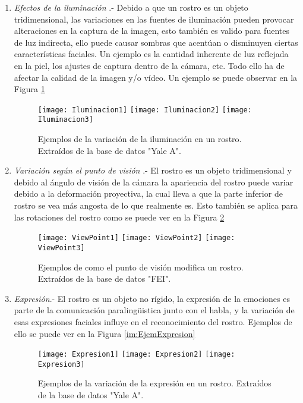 \begin{enumerate}[1.]
\item \textit{Efectos de la iluminación} \cite{kalocsai1998face} \cite{johnston1992recognising} \cite{bruce1998human} \cite{hill1996effects}.- Debido a que un rostro es un objeto tridimensional, las variaciones en las fuentes de iluminación pueden provocar alteraciones en la captura de la imagen, esto también es valido para fuentes de luz indirecta, ello puede causar sombras que acentúan o disminuyen ciertas características faciales. Un ejemplo es la cantidad inherente de luz reflejada en la piel, los ajustes de captura dentro de la cámara, etc. Todo ello ha de afectar la calidad de la imagen y/o vídeo. Un ejemplo se puede observar en la Figura \ref{im:EjemIluminacion}
\begin{figure}[h]
\center
\texttt{[image: Iluminacion1]}
\texttt{[image: Iluminacion2]}
\texttt{[image: Iluminacion3]}
\caption{Ejemplos de la variación de la iluminación en un rostro. Extraídos de la base de datos "Yale A".}
\label{im:EjemIluminacion}
\end{figure}
\item \textit{Variación según el punto de visión}  \cite{hill1997information}.- El rostro es un objeto tridimensional y debido al ángulo de visión de la cámara la apariencia del rostro puede variar debido a la deformación proyectiva, la cual lleva a que la parte inferior de rostro se vea más angosta de lo que realmente es. Esto también se aplica para las rotaciones del rostro como se puede ver en la Figura \ref{im:EjemViewPoint}
\begin{figure}[h]
\center
\texttt{[image: ViewPoint1]}
\texttt{[image: ViewPoint2]}
\texttt{[image: ViewPoint3]}
\caption{Ejemplos de como el punto de visión modifica un rostro. Extraídos de la base de datos "FEI".}
\label{im:EjemViewPoint}
\end{figure}
\item \textit{Expresión}.-  El rostro es un objeto no rígido, la expresión de la emociones es parte de la comunicación paralingüistica junto con el habla, y la variación de esas expresiones faciales influye en el reconocimiento del rostro. Ejemplos de ello se puede ver en la Figura \ref{im:EjemExpresion}
\begin{figure}[h]
\center
\texttt{[image: Expresion1]}
\texttt{[image: Expresion2]}
\texttt{[image: Expresion3]}
\caption{Ejemplos de la variación de la expresión en un rostro. Extraídos de la base de datos "Yale A".}

\end{figure}
\end{enumerate}
